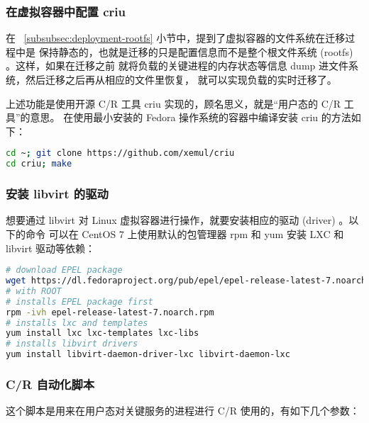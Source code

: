 \subsubsection{在虚拟容器中配置 criu}

在 ~\ref{subsubsec:deployment-rootfs} 小节中，提到了虚拟容器的文件系统在迁移过程中是
保持静态的，也就是迁移的只是配置信息而不是整个根文件系统 (rootfs) 。这样，如果在迁移之前
就将负载的关键进程的内存状态等信息 dump 进文件系统，然后迁移之后再从相应的文件里恢复，
就可以实现负载的实时迁移了。

上述功能是使用开源 C/R 工具 criu 实现的，顾名思义，就是“用户态的 C/R 工具”的意思。
在使用最小安装的 Fedora 操作系统的容器中编译安装 criu 的方法如下：

\begin{lstlisting}[language=bash]
cd ~; git clone https://github.com/xemul/criu
cd criu; make
\end{lstlisting}

\subsubsection{安装 libvirt 的驱动}

想要通过 libvirt 对 Linux 虚拟容器进行操作，就要安装相应的驱动 (driver) 。以下的命令
可以在 CentOS 7 上使用默认的包管理器 rpm 和 yum 安装 LXC 和 libvirt 驱动等依赖：

\begin{lstlisting}[language=bash]
# download EPEL package
wget https://dl.fedoraproject.org/pub/epel/epel-release-latest-7.noarch.rpm
# with ROOT
# installs EPEL package first
rpm -ivh epel-release-latest-7.noarch.rpm
# installs lxc and templates
yum install lxc lxc-templates lxc-libs
# installs libvirt drivers
yum install libvirt-daemon-driver-lxc libvirt-daemon-lxc
\end{lstlisting}

\subsubsection{C/R 自动化脚本}
\label{subsubsec:cr-automation}

这个脚本是用来在用户态对关键服务的进程进行 C/R 使用的，有如下几个参数：

